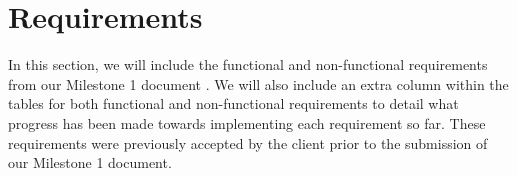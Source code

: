 \chapter{Requirements} \label{ch:Requirements}

In this section, we will include the functional and non-functional requirements from our Milestone 1 document \cite{coaker}. We will also include an extra column within the tables for both functional and non-functional requirements to detail what progress has been made towards implementing each requirement so far. These requirements were previously accepted by the client prior to the submission of our Milestone 1 document.



